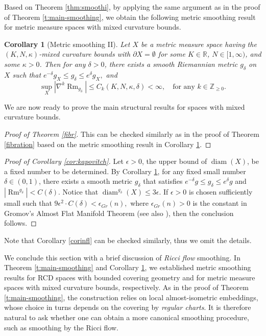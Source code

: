 \documentclass[11pt,reqno]{amsart}
\newtheorem{corollary}[theorem]{Corollary}
\theoremstyle{definition}
\numberwithin{equation}{section}
\newcommand{\p}{\partial}
\DeclareMathOperator{\diam}{diam}
\DeclareMathOperator{\Rm}{Rm}
\begin{document}
Based on Theorem \ref{thm:smoothi}, by applying the same argument as in the proof of Theorem \ref{t:main-smoothing}, we obtain the following metric smoothing result for metric measure spaces with mixed curvature bounds. 
\begin{corollary}[Metric smoothing II] \label{c:smoothing-mcb} 
 Let $X$ be a metric measure space having the $(K, N, \kappa)$-mixed curvature bounds with $\p X = \emptyset$ for some $K \in \mathbb{R}$, $N \in [1, \infty)$, and some $\kappa >0$.
 Then  for any  $\delta > 0$, there exists a smooth Riemannian metric $g_{\delta}$ on $X$ such that 
$
	 e^{-\delta} g_X  \leq g_{\delta}  \leq e^{\delta} g_X,
$ and
 \begin{equation}
 \sup\limits_{X} |\nabla^k \Rm_{g_{\delta}}| \leq C_k (K, N, \kappa, \delta)<\infty, \quad \text{for any $k \in \mathbb{Z}_{\ge 0}$.}  
  \end{equation} 
\end{corollary}

We are now ready to prove the main structural results for spaces with mixed curvature bounds.

\begin{proof}[Proof of Theorem \ref{fibr}]
This can be checked similarly as in the proof of Theorem \ref{fibration} based on the metric smoothing result in Corollary \ref{c:smoothing-mcb}.
\end{proof}






\begin{proof}[Proof of Corollary \ref{cor:kapovitch}] Let $\epsilon > 0$, the upper bound of $\diam(X)$, be a fixed number to be determined.
By Corollary  \ref{c:smoothing-mcb},  for any fixed small number $\delta \in (0, 1)$, there exists a smooth metric $g_{\delta}$ that satisfies $e^{-\delta}g \leq g_{\delta} \leq e^{\delta} g$ and $|\Rm^{g_{\delta}}| < C(\delta)$. Notice that 
$
\diam^{g_{\delta}} (X)  \leq 3 \epsilon.
$
If $\epsilon > 0$ is chosen sufficiently small such that 
$
9\epsilon^2 \cdot C(\delta) < \epsilon_{Gr}(n),
$
where $\epsilon_{Gr}(n) > 0$ is the constant in Gromov's Almost Flat Manifold Theorem \cite{Gromov} (see also \cite{Ruh}), then the conclusion follows. 
\end{proof}
Note that Corollary \ref{corinfl} can be checked similarly, thus we omit the details.

 We conclude this section with a brief discussion of \textit{Ricci flow} smoothing.
In Theorem \ref{t:main-smoothing} and Corollary \ref{c:smoothing-mcb}, we established metric smoothing results for RCD spaces with bounded covering geometry and for metric measure spaces with mixed curvature bounds, respectively. 
 As in the proof of Theorem \ref{t:main-smoothing}, the construction relies on   local almost-isometric embeddings, whose choice in turns depends on the covering by {\it regular charts}. It is therefore natural to ask whether one can obtain a more canonical smoothing procedure, such as smoothing by the Ricci flow.
\end{document}
